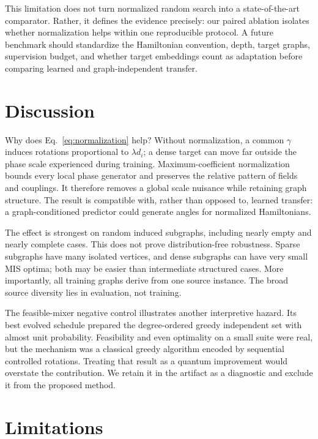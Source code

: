 \documentclass[10pt,twocolumn]{article}
\begin{document}
This limitation does not turn normalized random search into a state-of-the-art comparator. Rather, it defines the evidence precisely: our paired ablation isolates whether normalization helps within one reproducible protocol. A future benchmark should standardize the Hamiltonian convention, depth, target graphs, supervision budget, and whether target embeddings count as adaptation before comparing learned and graph-independent transfer.

\section{Discussion}

Why does Eq.~\eqref{eq:normalization} help? Without normalization, a common $\gamma$ induces rotations proportional to $\lambda d_i$; a dense target can move far outside the phase scale experienced during training. Maximum-coefficient normalization bounds every local phase generator and preserves the relative pattern of fields and couplings. It therefore removes a global scale nuisance while retaining graph structure. The result is compatible with, rather than opposed to, learned transfer: a graph-conditioned predictor could generate angles for normalized Hamiltonians.

The effect is strongest on random induced subgraphs, including nearly empty and nearly complete cases. This does not prove distribution-free robustness. Sparse subgraphs have many isolated vertices, and dense subgraphs can have very small MIS optima; both may be easier than intermediate structured cases. More importantly, all training graphs derive from one source instance. The broad source diversity lies in evaluation, not training.

The feasible-mixer negative control illustrates another interpretive hazard. Its best evolved schedule prepared the degree-ordered greedy independent set with almost unit probability. Feasibility and even optimality on a small suite were real, but the mechanism was a classical greedy algorithm encoded by sequential controlled rotations. Treating that result as a quantum improvement would overstate the contribution. We retain it in the artifact as a diagnostic and exclude it from the proposed method.

\section{Limitations}
\end{document}
